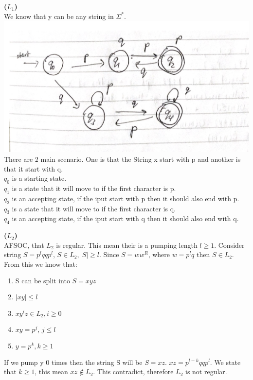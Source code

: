 \documentclass[a4paper, 11pt]{article}
\renewcommand{\part}[1] {\vspace{.10in} {\bf (#1)}}
\begin{document}
\part{$L_1$}\\
We know that y can be any string in $\Sigma^*$. \\
\includegraphics[width=\textwidth]{Q2-1-1.png}\\
There are 2 main scenario. One is that the String x start with p and another is that it start with q.\\
$q_0$ is a starting state.\\
$q_1$ is a state that it will move to if the first character is p.\\
$q_2$ is an accepting state, if the iput start with p then it should also end with p.\\
$q_3$ is a state that it will move to if the first character is q.\\
$q_4$ is an accepting state, if the iput start with q then it should also end with q.

\part{$L_2$}\\
AFSOC, that $L_2$ is regular. This mean their is a pumping length $l \geq 1$.  Consider string $S = p^lqqp^l$, $S \in L_2, |S| \geq l$. Since $S = ww^R$, where $w = p^lq$ then $S \in L_2$. From this we know that:
\begin{enumerate}
	\item S can be split into $S = xyz$
	\item $|xy| \leq l$
	\item $xy^iz \in L_2, i \geq 0$
	\item $xy = p^j$, $j \leq l$
	\item $y = p^k, k \geq 1$
\end{enumerate}
If we pump y 0 times then the string S will be $S = xz$. $xz = p^{l-k}qqp^l$. We state that $k \geq 1$, this mean $xz \notin L_2$. This contradict, therefore $L_2$ is not regular.
\end{document}
